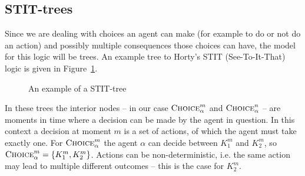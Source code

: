 \documentclass{article}
\begin{document}
\subsection{STIT-trees}
Since we are dealing with choices an agent can make (for example to do or not do an action) and possibly multiple consequences those choices can have, the model for this logic will be trees. An example tree to Horty's STIT (See-To-It-That) logic is given in Figure~\ref{fig:stit-tree}. 
\begin{figure}[ht]
    \centering
    \caption{An example of a STIT-tree}
    \label{fig:stit-tree}
\end{figure}

In these trees the interior nodes -- in our case $\textsc{Choice}^m_{\alpha}$ and $\textsc{Choice}^n_{\alpha}$ -- are moments in time where a decision can be made by the agent in question. In this context a decision at moment $m$ is a set of actions, of which the agent must take exactly one. For $\textsc{Choice}^m_{\alpha}$ the agent $\alpha$ can decide between $K_1^m$ and $K_2^m$, so $\textsc{Choice}^m_{\alpha} = \{K_1^m, K_2^m\}$. Actions can be non-deterministic, i.e. the same action may lead to multiple different outcomes -- this is the case for $K_2^m$.
\end{document}
